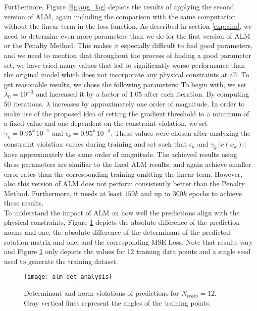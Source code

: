 Furthermore, Figure \ref{fig:aug_lag} depicts the results of applying the second version of ALM, again including the comparison with the same computation without the linear term in the loss function. As described in section \ref{exp:alm}, we need to determine even more parameters than we do for the first version of ALM or the Penalty Method. This makes it especially difficult to find good parameters, and we need to mention that throughout the process of finding a good parameter set, we have tried many values that led to significantly worse performance than the original model which does not incorporate any physical constraints at all. To get reasonable results, we chose the following parameters: To begin with, we set $\lambda_{0} = 10^{-3}$ and increased it by a factor of $1.05$ after each iteration. By computing 50 iterations, $\lambda$ increases by approximately one order of magnitude. In order to make use of the proposed idea of setting the gradient threshold to a minimum of a fixed value and one dependent on the constraint violation, we set $\gamma_k = 0.95^k\,10^{-1}$ and $\epsilon_k = 0.95^k\,10^{-3}$. These values were chosen after analyzing the constraint violation values during training and set such that $\epsilon_k$ and $\gamma_k ||c(x_k)||$ have approximately the same order of magnitude. The achieved results using these parameters are similiar to the fixed ALM results, and again achieve smaller error rates than the corresponding training omitting the linear term. However, also this version of ALM does not perform consistently better than the Penalty Method. Furthermore, it needs at least $150k$ and up to $300k$ epochs to achieve these results.\\
\indent To understand the impact of ALM on how well the predictions align with the physical constraints, Figure \ref{fig:alm_det_analysis} depicts the absolute difference of the prediction norms and one, the absolute difference of the determinant of the predicted rotation matrix and one, and the corresponding MSE Loss. Note that results vary and Figure \ref{fig:alm_det_analysis} only depicts the values for 12 training data points and a single seed used to generate the training dataset.

\begin{figure}[H]
	\texttt{[image: alm\_det\_analysis]}
	\caption{Determinant and norm violations of predictions for $N_{train} = 12$. Gray vertical lines represent the angles of the training points.}
	\label{fig:alm_det_analysis}
\end{figure}

